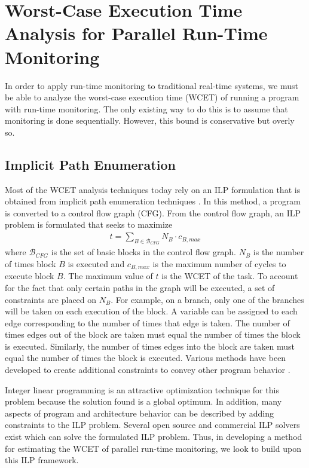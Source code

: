 \chapter{Worst-Case Execution Time Analysis for Parallel Run-Time Monitoring}
\label{chap:monitoring_wcet}

In order to apply run-time monitoring to traditional real-time systems, we must
be able to analyze the worst-case execution time (WCET) of running a program
with run-time monitoring. The only existing way to do this is to assume that
monitoring is done sequentially. However, this bound is conservative but overly so.

\section{Implicit Path Enumeration}
\label{sec:formulation:ipet}

Most of the WCET analysis techniques today rely on an ILP formulation that is 
obtained from implicit path enumeration techniques \cite{li-ipet-dac95}. 
In this method, a program is converted to a control flow
graph (CFG). From the control flow graph, an ILP problem is formulated that
seeks to maximize
\begin{align*}
  t = \sum_{B \in \mathcal{B}_{CFG}}{N_B \cdot c_{B,max}}
\end{align*} 
where $\mathcal{B}_{CFG}$ is the set of basic blocks in the control flow graph. $N_{B}$
is the number of times block $B$ is executed and $c_{B,max}$ is the maximum number of cycles
to execute block $B$. The maximum value of $t$ is the WCET of the task.  To
account for the fact that only certain paths in the graph will be executed, a
set of constraints are placed on $N_{B}$. For example, on a branch, only one of
the branches will be taken on each execution
of the block. A variable can be assigned to each edge corresponding to the
number of times that edge is taken.
The number of times edges out of the block are taken must equal the number of
times the block is executed.
 Similarly,
the number of times edges into the block are taken must equal the number of
times the block is executed. Various methods have been developed to
create additional constraints to convey other program behavior \cite{li-ipet-dac95, wcetsurvey-tecs08}.

Integer linear programming is an attractive optimization technique
for this problem because the solution found is a global optimum. In
addition, many aspects of program and architecture behavior can be described by
adding constraints to the ILP problem. 
Several open source and commercial ILP solvers exist which can solve the formulated ILP problem.
Thus, in developing a method for
estimating the WCET of parallel run-time monitoring, we look to build upon this
ILP framework.

